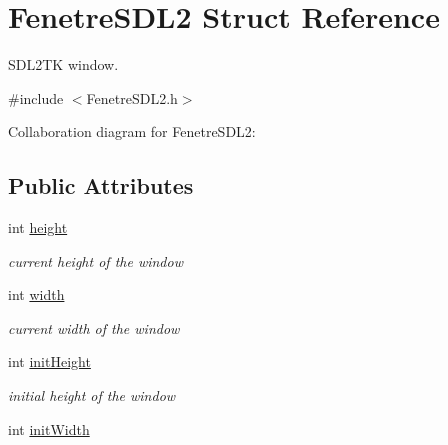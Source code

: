\hypertarget{structFenetreSDL2}{}\section{Fenetre\+S\+D\+L2 Struct Reference}
\label{structFenetreSDL2}


S\+D\+L2\+TK window.  




{\ttfamily \#include $<$Fenetre\+S\+D\+L2.\+h$>$}



Collaboration diagram for Fenetre\+S\+D\+L2\+:
\subsection*{Public Attributes}
\begin{DoxyCompactItemize}
\item 
int \hyperlink{structFenetreSDL2_aeaecc1454f5f4d31067de45e61c05f01}{height}\hypertarget{structFenetreSDL2_aeaecc1454f5f4d31067de45e61c05f01}{}\label{structFenetreSDL2_aeaecc1454f5f4d31067de45e61c05f01}

\begin{DoxyCompactList}\small\item\em current height of the window \end{DoxyCompactList}\item 
int \hyperlink{structFenetreSDL2_ac45087e9400a3ca28331db9ee7dc713f}{width}\hypertarget{structFenetreSDL2_ac45087e9400a3ca28331db9ee7dc713f}{}\label{structFenetreSDL2_ac45087e9400a3ca28331db9ee7dc713f}

\begin{DoxyCompactList}\small\item\em current width of the window \end{DoxyCompactList}\item 
int \hyperlink{structFenetreSDL2_ab5d178203cbb174048be3eea45b297a5}{init\+Height}\hypertarget{structFenetreSDL2_ab5d178203cbb174048be3eea45b297a5}{}\label{structFenetreSDL2_ab5d178203cbb174048be3eea45b297a5}

\begin{DoxyCompactList}\small\item\em initial height of the window \end{DoxyCompactList}\item 
int \hyperlink{structFenetreSDL2_a6b8858b4611f794e5f95e880e47d9b5d}{init\+Width}\hypertarget{structFenetreSDL2_a6b8858b4611f794e5f95e880e47d9b5d}{}\label{structFenetreSDL2_a6b8858b4611f794e5f95e880e47d9b5d}


\end{DoxyCompactItemize}

